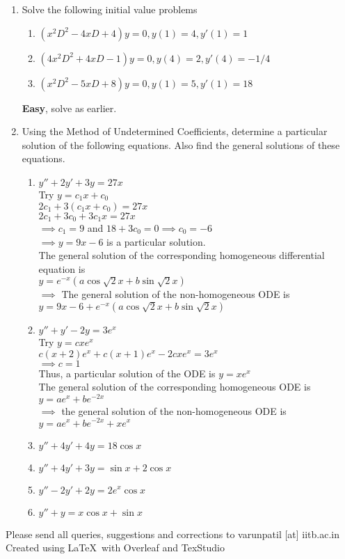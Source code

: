 \documentclass[a4paper]{article}
\begin{document}
\begin{enumerate}
\begin{enumerate}
	\end{enumerate}

	\item Solve the following initial value problems
	\begin{enumerate}
		\item $(x^2D^2-4xD+4)y=0, y(1)=4, y'(1)=1$
		\item $(4x^2D^2+4xD-1)y=0, y(4)=2, y'(4)=-1/4$
		\item $(x^2D^2-5xD+8)y=0,y(1)=5,y'(1)=18$
	\end{enumerate}
	\textbf{Easy}, solve as earlier.
	
	\item Using the Method of Undetermined Coefficients, determine a particular solution of the following equations. Also find the general solutions of these equations.
	\begin{enumerate}
		\item $y''+2y'+3y=27x$\\
		Try $y=c_1x+c_0$\\
		$2c_1+3(c_1x+c_0)=27x$\\
		$2c_1+3c_0+3c_1x=27x$\\
		$\implies c_1=9$ and $18+3c_0=0 \implies c_0=-6$\\
		$\implies y=9x-6$ is a particular solution.\\
		The general solution of the corresponding homogeneous differential equation is\\
		$y=e^{-x}(a\cos\sqrt{2}x + b\sin\sqrt{2}x)$\\
		$\implies$ The general solution of the non-homogeneous ODE is \\
		$y=9x-6 + e^{-x}(a\cos\sqrt{2}x + b\sin\sqrt{2}x)$
				
		\item $y''+y'-2y=3e^x$\\
        Try $y=cxe^{x}$\\
        $c(x+2)e^x+c(x+1)e^x-2cxe^x=3e^x$\\
        $\implies c=1$\\
        Thus, a particular solution of the ODE is $y=xe^x$\\
        The general solution of the corresponding homogeneous ODE is $y=ae^x+be^{-2x}$\\
        $\implies$ the general solution of the non-homogeneous ODE is $y=ae^x+be^{-2x} +xe^x$
        
		\item $y''+4y'+4y=18\cos x$
		\item $y''+4y'+3y=\sin x + 2\cos x$
		\item $y''-2y'+2y=2e^x\cos x$
		\item $y''+y=x\cos x + \sin x$
	\end{enumerate}
	

\end{enumerate}

\begin{center}
Please send all queries, suggestions and corrections to varunpatil [at] iitb.ac.in
\\Created using \LaTeX \ with Overleaf and TexStudio
\end{center}
\end{document}
